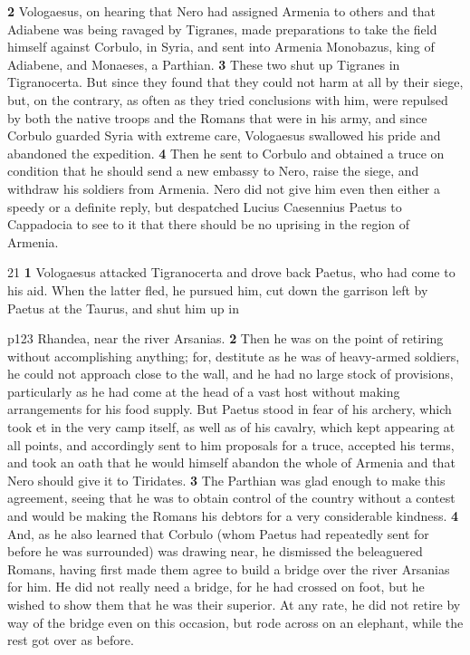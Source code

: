\textbf{2} Vologaesus, on hearing that Nero had assigned Armenia to others and that Adiabene was being ravaged by Tigranes, made preparations to take the field himself against Corbulo, in Syria, and sent into Armenia Monobazus, king of Adiabene, and Monaeses, a Parthian. \textbf{3} These two shut up Tigranes in Tigranocerta. But since they found that they could not harm at all by their siege, but, on the contrary, as often as they tried conclusions with him, were repulsed by both the native troops and the Romans that were in his army, and since Corbulo guarded Syria with extreme care, Vologaesus swallowed his pride and abandoned the expedition. \textbf{4} Then he sent to Corbulo and obtained a truce on condition that he should send a new embassy to Nero, raise the siege, and withdraw his soldiers from Armenia. Nero did not give him even then either a speedy or a definite reply, but despatched Lucius Caesennius Paetus to Cappadocia to see to it that there should be no uprising in the region of Armenia.

21
\textbf{1} Vologaesus attacked Tigranocerta and drove back Paetus, who had come to his aid. When the latter fled, he pursued him, cut down the garrison left by Paetus at the Taurus, and shut him up in

p123 Rhandea, near the river Arsanias. \textbf{2} Then he was on the point of retiring without accomplishing anything; for, destitute as he was of heavy-armed soldiers, he could not approach close to the wall, and he had no large stock of provisions, particularly as he had come at the head of a vast host without making arrangements for his food supply. But Paetus stood in fear of his archery, which took et in the very camp itself, as well as of his cavalry, which kept appearing at all points, and accordingly sent to him proposals for a truce, accepted his terms, and took an oath that he would himself abandon the whole of Armenia and that Nero should give it to Tiridates. \textbf{3} The Parthian was glad enough to make this agreement, seeing that he was to obtain control of the country without a contest and would be making the Romans his debtors for a very considerable kindness. \textbf{4} And, as he also learned that Corbulo (whom Paetus had repeatedly sent for before he was surrounded) was drawing near, he dismissed the beleaguered Romans, having first made them agree to build a bridge over the river Arsanias for him. He did not really need a bridge, for he had crossed on foot, but he wished to show them that he was their superior. At any rate, he did not retire by way of the bridge even on this occasion, but rode across on an elephant, while the rest got over as before.

